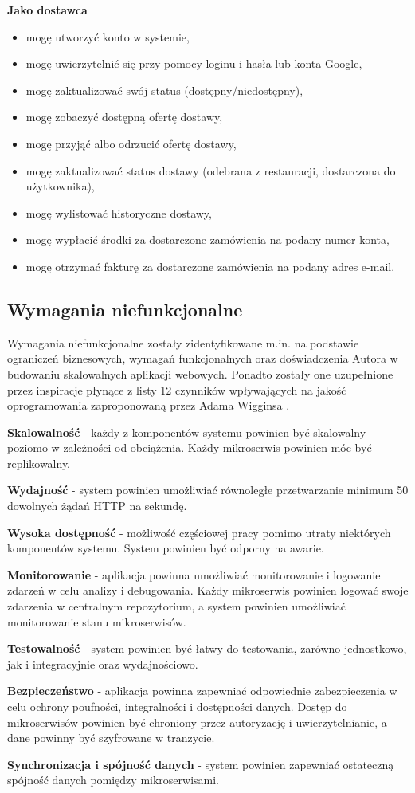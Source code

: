 \medskip

\textbf{Jako dostawca}
\begin{itemize}
    \item mogę utworzyć konto w systemie,
    \item mogę uwierzytelnić się przy pomocy loginu i hasła lub konta Google,
    \item mogę zaktualizować swój status (dostępny/niedostępny),
    \item mogę zobaczyć dostępną ofertę dostawy,
    \item mogę przyjąć albo odrzucić ofertę dostawy,
    \item mogę zaktualizować status dostawy (odebrana z restauracji, dostarczona do użytkownika),
    \item mogę wylistować historyczne dostawy,
    \item mogę wypłacić środki za dostarczone zamówienia na podany numer konta,
    \item mogę otrzymać fakturę za dostarczone zamówienia na podany adres e-mail.
\end{itemize}

\subsection{Wymagania niefunkcjonalne}

Wymagania niefunkcjonalne zostały zidentyfikowane m.in. na podstawie ograniczeń biznesowych, wymagań funkcjonalnych oraz doświadczenia Autora w budowaniu skalowalnych aplikacji webowych. Ponadto zostały one uzupełnione przez inspiracje płynące z listy 12 czynników wpływających na jakość oprogramowania zaproponowaną przez Adama Wigginsa \cite{12factors}.

\textbf{Skalowalność} - każdy z komponentów systemu powinien być skalowalny poziomo w zależności od obciążenia. Każdy mikroserwis powinien móc być replikowalny.

\textbf{Wydajność} - system powinien umożliwiać równoległe przetwarzanie minimum 50 dowolnych żądań HTTP na sekundę.

\textbf{Wysoka dostępność} - możliwość częściowej pracy pomimo utraty niektórych komponentów systemu. System powinien być odporny na awarie.

\textbf{Monitorowanie} - aplikacja powinna umożliwiać monitorowanie i logowanie zdarzeń w celu analizy i debugowania. Każdy mikroserwis powinien logować swoje zdarzenia w centralnym repozytorium, a system powinien umożliwiać monitorowanie stanu mikroserwisów.

\textbf{Testowalność} - system powinien być łatwy do testowania, zarówno jednostkowo, jak i integracyjnie oraz wydajnościowo.

\textbf{Bezpieczeństwo} - aplikacja powinna zapewniać odpowiednie zabezpieczenia w celu ochrony poufności, integralności i dostępności danych. Dostęp do mikroserwisów powinien być chroniony przez autoryzację i uwierzytelnianie, a dane powinny być szyfrowane w tranzycie.

\textbf{Synchronizacja i spójność danych} - system powinien zapewniać ostateczną spójność danych pomiędzy mikroserwisami.